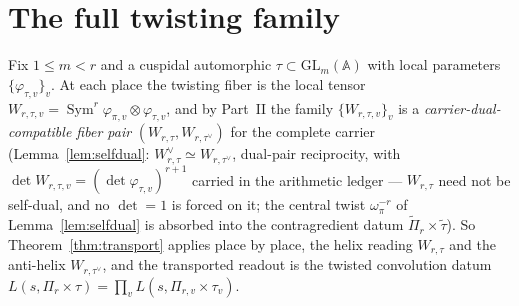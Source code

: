 \documentclass[11pt]{article}
\theoremstyle{definition}
\newcommand{\Sym}{\operatorname{Sym}}
\begin{document}
\section{The full twisting family}\label{sec:cps-twist}
Fix $1\le m<r$ and a cuspidal automorphic $\tau\subset\mathrm{GL}_m(\mathbb A)$ with local parameters
$\{\varphi_{\tau,v}\}_v$. At each place the twisting fiber is the local tensor
$W_{r,\tau,v}=\Sym^r\varphi_{\pi,v}\otimes\varphi_{\tau,v}$, and by Part~II the family
$\{W_{r,\tau,v}\}_v$ is a \emph{carrier-dual-compatible fiber pair} $(W_{r,\tau},W_{r,\tau^\vee})$ for the
complete carrier (Lemma~\ref{lem:selfdual}: $W_{r,\tau}^\vee\simeq W_{r,\tau^\vee}$, dual-pair reciprocity, with
$\det W_{r,\tau,v}=(\det\varphi_{\tau,v})^{r+1}$ carried in the arithmetic ledger --- $W_{r,\tau}$ need not be self-dual, and no $\det=1$ is forced on it; the central twist $\omega_\pi^{-r}$ of Lemma~\ref{lem:selfdual} is absorbed into the contragredient datum $\widetilde\Pi_r\times\widetilde\tau$). So Theorem~\ref{thm:transport} applies place by place, the helix
reading $W_{r,\tau}$ and the anti-helix $W_{r,\tau^\vee}$, and the transported readout is the twisted
convolution datum $L(s,\Pi_r\times\tau)=\prod_v L(s,\Pi_{r,v}\times\tau_v)$.
\end{document}
